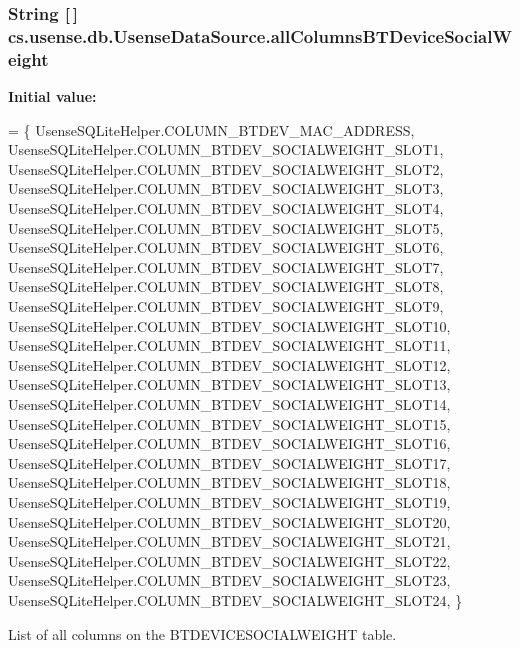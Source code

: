 \subsubsection[{all\+Columns\+B\+T\+Device\+Social\+Weight}]{\setlength{\rightskip}{0pt plus 5cm}String \mbox{[}$\,$\mbox{]} cs.\+usense.\+db.\+Usense\+Data\+Source.\+all\+Columns\+B\+T\+Device\+Social\+Weight\hspace{0.3cm}{\ttfamily [private]}}\label{classcs_1_1usense_1_1db_1_1_usense_data_source_a9948c3c3b6014ecafccea0ce7fa0ba01}
{\bfseries Initial value\+:}
\begin{DoxyCode}
= \{ 
            UsenseSQLiteHelper.COLUMN\_BTDEV\_MAC\_ADDRESS,
            UsenseSQLiteHelper.COLUMN\_BTDEV\_SOCIALWEIGHT\_SLOT1,
            UsenseSQLiteHelper.COLUMN\_BTDEV\_SOCIALWEIGHT\_SLOT2,
            UsenseSQLiteHelper.COLUMN\_BTDEV\_SOCIALWEIGHT\_SLOT3,
            UsenseSQLiteHelper.COLUMN\_BTDEV\_SOCIALWEIGHT\_SLOT4,
            UsenseSQLiteHelper.COLUMN\_BTDEV\_SOCIALWEIGHT\_SLOT5,
            UsenseSQLiteHelper.COLUMN\_BTDEV\_SOCIALWEIGHT\_SLOT6,
            UsenseSQLiteHelper.COLUMN\_BTDEV\_SOCIALWEIGHT\_SLOT7,
            UsenseSQLiteHelper.COLUMN\_BTDEV\_SOCIALWEIGHT\_SLOT8,
            UsenseSQLiteHelper.COLUMN\_BTDEV\_SOCIALWEIGHT\_SLOT9,
            UsenseSQLiteHelper.COLUMN\_BTDEV\_SOCIALWEIGHT\_SLOT10,
            UsenseSQLiteHelper.COLUMN\_BTDEV\_SOCIALWEIGHT\_SLOT11,
            UsenseSQLiteHelper.COLUMN\_BTDEV\_SOCIALWEIGHT\_SLOT12,
            UsenseSQLiteHelper.COLUMN\_BTDEV\_SOCIALWEIGHT\_SLOT13,
            UsenseSQLiteHelper.COLUMN\_BTDEV\_SOCIALWEIGHT\_SLOT14,
            UsenseSQLiteHelper.COLUMN\_BTDEV\_SOCIALWEIGHT\_SLOT15,
            UsenseSQLiteHelper.COLUMN\_BTDEV\_SOCIALWEIGHT\_SLOT16,
            UsenseSQLiteHelper.COLUMN\_BTDEV\_SOCIALWEIGHT\_SLOT17,
            UsenseSQLiteHelper.COLUMN\_BTDEV\_SOCIALWEIGHT\_SLOT18,
            UsenseSQLiteHelper.COLUMN\_BTDEV\_SOCIALWEIGHT\_SLOT19,
            UsenseSQLiteHelper.COLUMN\_BTDEV\_SOCIALWEIGHT\_SLOT20,
            UsenseSQLiteHelper.COLUMN\_BTDEV\_SOCIALWEIGHT\_SLOT21,
            UsenseSQLiteHelper.COLUMN\_BTDEV\_SOCIALWEIGHT\_SLOT22,
            UsenseSQLiteHelper.COLUMN\_BTDEV\_SOCIALWEIGHT\_SLOT23,
            UsenseSQLiteHelper.COLUMN\_BTDEV\_SOCIALWEIGHT\_SLOT24,
    \}
\end{DoxyCode}
List of all columns on the B\+T\+D\+E\+V\+I\+C\+E\+S\+O\+C\+I\+A\+L\+W\+E\+I\+G\+H\+T table. \hypertarget{classcs_1_1usense_1_1db_1_1_usense_data_source_a95178df715a8c412f84764ab9be54d81}{}
